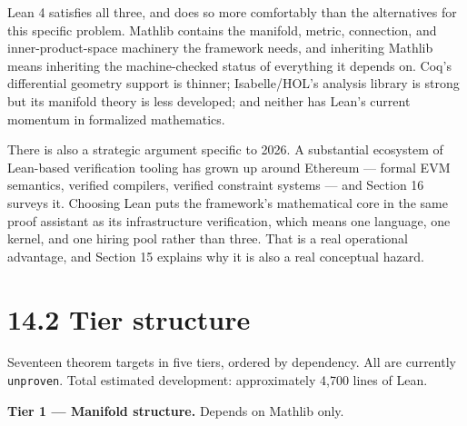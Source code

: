 \documentclass[
  11pt]{report}
\begin{document}
Lean 4 satisfies all three, and does so more comfortably than the
alternatives for this specific problem. Mathlib contains the manifold,
metric, connection, and inner-product-space machinery the framework
needs, and inheriting Mathlib means inheriting the machine-checked
status of everything it depends on. Coq's differential geometry support
is thinner; Isabelle/HOL's analysis library is strong but its manifold
theory is less developed; and neither has Lean's current momentum in
formalized mathematics.

There is also a strategic argument specific to 2026. A substantial
ecosystem of Lean-based verification tooling has grown up around
Ethereum --- formal EVM semantics, verified compilers, verified
constraint systems --- and Section 16 surveys it. Choosing Lean puts the
framework's mathematical core in the same proof assistant as its
infrastructure verification, which means one language, one kernel, and
one hiring pool rather than three. That is a real operational advantage,
and Section 15 explains why it is also a real conceptual hazard.

\hypertarget{tier-structure}{%
\section{14.2 Tier structure}\label{tier-structure}}

Seventeen theorem targets in five tiers, ordered by dependency. All are
currently \texttt{unproven}. Total estimated development: approximately
4,700 lines of Lean.

\textbf{Tier 1 --- Manifold structure.} Depends on Mathlib only.
\end{document}
